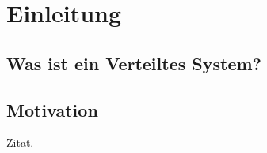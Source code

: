 \chapter{Einleitung}

\section{Was ist ein Verteiltes System?}

\section{Motivation}
\label{sec:Motivation}

\cite{wilcox} Zitat.
